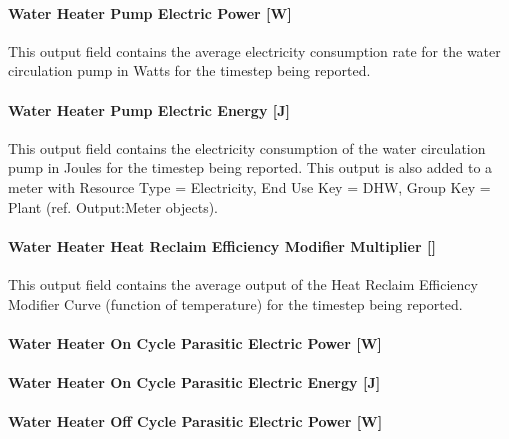 \paragraph{Water Heater Pump Electric Power {[}W{]}}\label{water-heater-pump-electric-power-w}

This output field contains the average electricity consumption rate for the water circulation pump in Watts for the timestep being reported.

\paragraph{Water Heater Pump Electric Energy {[}J{]}}\label{water-heater-pump-electric-energy-j}

This output field contains the electricity consumption of the water circulation pump in Joules for the timestep being reported. This output is also added to a meter with Resource Type = Electricity, End Use Key = DHW, Group Key = Plant (ref. Output:Meter objects).

\paragraph{\texorpdfstring{Water Heater Heat Reclaim Efficiency Modifier Multiplier {[]}}{Water Heater Heat Reclaim Efficiency Modifier Multiplier }}\label{water-heater-heat-reclaim-efficiency-modifier-multiplier}

This output field contains the average output of the Heat Reclaim Efficiency Modifier Curve (function of temperature) for the timestep being reported.

\paragraph{Water Heater On Cycle Parasitic Electric Power {[}W{]}}\label{water-heater-on-cycle-parasitic-electric-power-w}

\paragraph{Water Heater On Cycle Parasitic Electric Energy {[}J{]}}\label{water-heater-on-cycle-parasitic-electric-energy-j}

\paragraph{Water Heater Off Cycle Parasitic Electric Power {[}W{]}}\label{water-heater-off-cycle-parasitic-electric-power-w}

